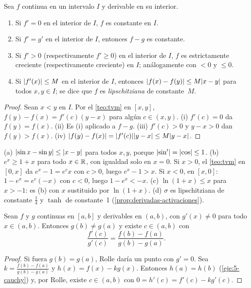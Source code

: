 \begin{corolario}\label{cor:tvm}
Sea $f$ continua en un intervalo $I$ y derivable en su interior.
\begin{enumerate}
  \item Si $f'=0$ en el interior de $I$, $f$ es constante en $I$.
  \item Si $f'=g'$ en el interior de $I$, entonces $f-g$ es constante.
  \item Si $f'>0$ (respectivamente $f'\ge0$) en el interior de $I$, $f$ es estrictamente creciente (respectivamente creciente) en $I$; análogamente con $<0$ y $\le0$.
  \item Si $\lvert f'(x)\rvert\le M$ en el interior de $I$, entonces $\lvert f(x)-f(y)\rvert\le M\lvert x-y\rvert$ para todos $x,y\in I$; se dice que $f$ es \emph{lipschitziana} de constante~$M$.
\end{enumerate}
\end{corolario}

\begin{proof}
Sean $x<y$ en $I$. Por el \cref{teo:tvm} en $[x,y]$, $f(y)-f(x)=f'(c)(y-x)$ para algún $c\in(x,y)$. (i) $f'(c)=0$ da $f(y)=f(x)$. (ii) Es (i) aplicado a $f-g$. (iii) $f'(c)>0$ y $y-x>0$ dan $f(y)>f(x)$. (iv) $\lvert f(y)-f(x)\rvert=\lvert f'(c)\rvert\lvert y-x\rvert\le M\lvert y-x\rvert$.
\end{proof}

\begin{ejemplo}\label{ej:desigualdades}
(a) $\lvert\sin x-\sin y\rvert\le\lvert x-y\rvert$ para todos $x,y$, porque $\lvert\sin'\rvert=\lvert\cos\rvert\le1$.
(b) $e^{x}\ge1+x$ para todo $x\in\mathbb{R}$, con igualdad solo en $x=0$. Si $x>0$, el \cref{teo:tvm} en $[0,x]$ da $e^{x}-1=e^{c}x$ con $c>0$, luego $e^{x}-1>x$. Si $x<0$, en $[x,0]$: $1-e^{x}=e^{c}(-x)$ con $c<0$, luego $1-e^{x}<-x$.
(c) $\ln(1+x)\le x$ para $x>-1$: es (b) con $x$ sustituido por $\ln(1+x)$.
(d) $\sigma$ es lipschitziana de constante $\tfrac14$ y $\tanh$ de constante~1 (\cref{prop:derivadas-activaciones}).
\end{ejemplo}

\begin{teorema}\label{teo:cauchy}
Sean $f$ y $g$ continuas en $[a,b]$ y derivables en $(a,b)$, con $g'(x)\ne0$ para todo $x\in(a,b)$. Entonces $g(b)\ne g(a)$ y existe $c\in(a,b)$ con
\[
\frac{f'(c)}{g'(c)}=\frac{f(b)-f(a)}{g(b)-g(a)}.
\]
\end{teorema}

\begin{proof}
Si fuera $g(b)=g(a)$, Rolle daría un punto con $g'=0$. Sea $k=\frac{f(b)-f(a)}{g(b)-g(a)}$ y $h(x)=f(x)-kg(x)$. Entonces $h(a)=h(b)$ (\cref{eje:5-cauchy}) y, por Rolle, existe $c\in(a,b)$ con $0=h'(c)=f'(c)-kg'(c)$.
\end{proof}

